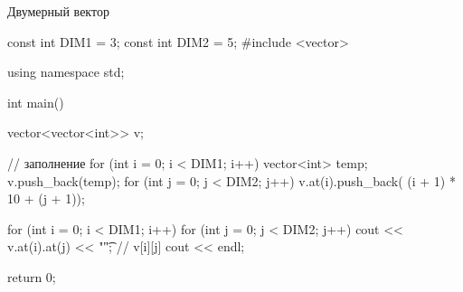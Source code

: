 \documentclass[
    9pt,
    hyperref={pdfencoding=unicode}
    ]{beamer}
\theoremstyle{definition}
\begin{document}
\begin{frame}[fragile]{Двумерный вектор}
	\footnotesize 
	\begin{cppcode}
		const int DIM1 = 3;
		const int DIM2 = 5;
		#include <vector>
		
		using namespace std;
		
		int main() {			
			vector<vector<int>> v;
			
			// заполнение
			for (int i = 0; i < DIM1; i++){
				vector<int> temp;
				v.push_back(temp);
				for (int j = 0; j < DIM2; j++) {
					v.at(i).push_back(
						(i + 1) * 10 + (j + 1));
				}
			}	
					
			for (int i = 0; i < DIM1; i++) {
				for (int j = 0; j < DIM2; j++) {
					cout << v.at(i).at(j) << "\t"; // v[i][j]
				}
				cout << endl;
			}
					
			return 0;
		}
	\end{cppcode}
\end{frame}





%    
\end{document}
